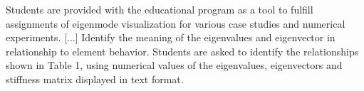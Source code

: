 \documentclass[11pt,a4paper]{article}
\newcommand{\campo}[1]{\textcolor{gris}{\footnotesize #1}}
\begin{document}
\vspace{3pt}\noindent{\small\textbf{p.\ 885} \quad \campo{«En relación con las herramientas educativas reportadas en la literatura --simuladores de armaduras, visualizadores de modos propios o entornos de procesamiento interactivo de ecuaciones del MEF--, la contribución distintiva de EduFEM es la cobertura integral del canal de cálculo [...] y una memoria de cálculo con sustitución...}}\par
\begin{pasaje}\footnotesize Students are provided with the educational program as a tool to fulfill assignments of eigenmode visualization for various case studies and numerical experiments. [...] Identify the meaning of the eigenvalues and eigenvector in relationship to element behavior. Students are asked to identify the relationships shown in Table 1, using numerical values of the eigenvalues, eigenvectors and stiffness matrix displayed in text format.\end{pasaje}
\vspace{6pt}
\end{document}
